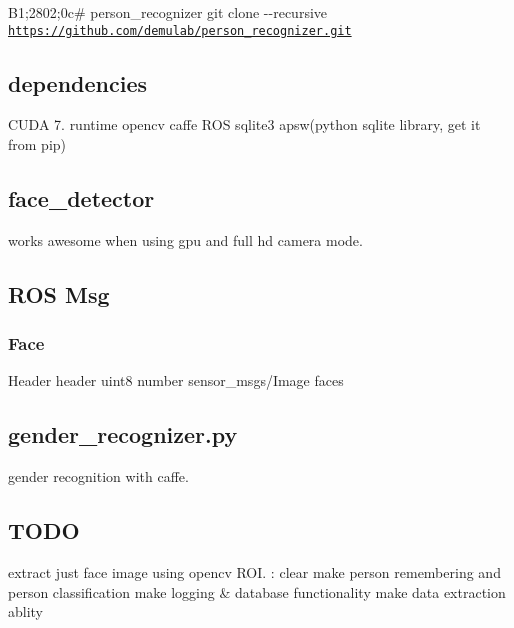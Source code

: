 B1;2802;0c\# person\-\_\-recognizer {\ttfamily git clone -\/-\/recursive \href{https://github.com/demulab/person_recognizer.git}{\tt https\-://github.\-com/demulab/person\-\_\-recognizer.\-git}} \subsection*{dependencies}

C\-U\-D\-A 7. runtime opencv caffe R\-O\-S sqlite3 apsw(python sqlite library, get it from pip) \subsection*{face\-\_\-detector}

works awesome when using gpu and full hd camera mode. \subsection*{R\-O\-S Msg}

\subsubsection*{Face}

Header header uint8 number sensor\-\_\-msgs/\-Image faces \subsection*{gender\-\_\-recognizer.\-py}

gender recognition with caffe. \subsection*{T\-O\-D\-O}

extract just face image using opencv R\-O\-I. \-: clear make person remembering and person classification make logging \& database functionality make data extraction ablity 